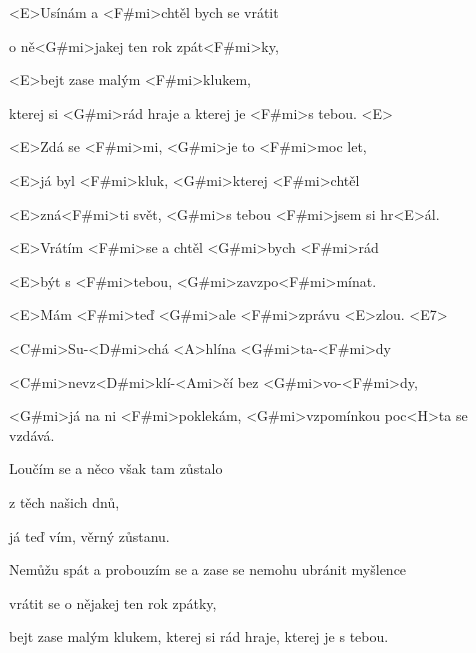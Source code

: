

\zs
<E>Usínám a <F#mi>chtěl bych se vrátit

o ně<G#mi>jakej ten rok zpát<F#mi>ky,

<E>bejt zase malým <F#mi>klukem,

kterej si <G#mi>rád hraje a kterej je <F#mi>s tebou. <E>
\ks

\zs
<E>Zdá se <F#mi>mi, <G#mi>je to <F#mi>moc let,

<E>já byl <F#mi>kluk, <G#mi>kterej <F#mi>chtěl

<E>zná<F#mi>ti svět, <G#mi>s tebou <F#mi>jsem si hr<E>ál.
\ks

\zs
<E>Vrátím <F#mi>se a chtěl <G#mi>bych <F#mi>rád

<E>být s <F#mi>tebou, <G#mi>zavzpo<F#mi>mínat.

<E>Mám <F#mi>teď <G#mi>ale <F#mi>zprávu <E>zlou. <E7>
\ks

\zr
<C#mi>Su-<D#mi>chá <A>hlína <G#mi>ta-<F#mi>dy

<C#mi>nevz<D#mi>klí-<Ami>čí bez <G#mi>vo-<F#mi>dy,

<G#mi>já na ni <F#mi>poklekám, <G#mi>vzpomínkou poc<H>ta se vzdává.
\kr

\zs
Loučím se a něco však tam zůstalo

z těch našich dnů,

já teď vím, věrný zůstanu.
\ks

\zr \kr

\zs
Nemůžu spát a probouzím se a zase se nemohu ubránit myšlence

vrátit se o nějakej ten rok zpátky,

bejt zase malým klukem, kterej si rád hraje, kterej je s tebou.
\ks

\kp
